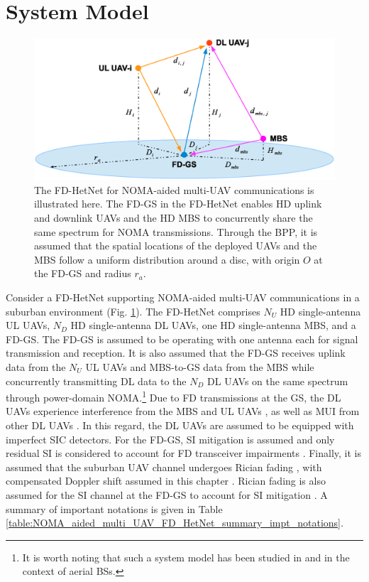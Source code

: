 \section{System Model} \label{NOMA_aided_multi_UAV_FD_HetNet_sec_sys_model}
\begin{figure} [tpb]
\centering
\vspace{-0.7cm}
\includegraphics [width=0.6\columnwidth]{chap7_fig/block_diagram3.eps} 
\vspace{-2cm}
\caption{The FD-HetNet for NOMA-aided multi-UAV communications is illustrated here. The FD-GS in the FD-HetNet enables HD uplink and downlink UAVs and the HD MBS to concurrently share the same spectrum for NOMA transmissions. Through the BPP, it is assumed that the spatial locations of the deployed UAVs and the MBS follow a uniform distribution around a disc, with origin $O$ at the FD-GS and radius $r_a$.}
\label{fig:NOMA_aided_multi_UAV_FD_HetNet_block_diagram}
\end{figure}

Consider a FD-HetNet supporting NOMA-aided multi-UAV communications in a suburban environment (Fig. \ref{fig:NOMA_aided_multi_UAV_FD_HetNet_block_diagram}). The FD-HetNet comprises $N_{U}$ HD single-antenna UL UAVs, $N_D$ HD single-antenna DL UAVs, one HD single-antenna MBS, and a FD-GS. The FD-GS is assumed to be operating with one antenna each for signal transmission and reception. It is also assumed that the FD-GS receives uplink data from the $N_{U}$ UL UAVs and MBS-to-GS data from the MBS while concurrently transmitting DL data to the $N_D$ DL UAVs on the same spectrum through power-domain NOMA.\footnote{It is worth noting that such a system model has been studied in \cite{zhang20183} and \cite{zhang2018number} in the context of aerial BSs.} Due to FD transmissions at the GS, the DL UAVs experience interference from the MBS and UL UAVs \cite{tan2018joint,ernest2019outage}, as well as MUI from other DL UAVs \cite{ernest2019noma}. In this regard, the DL UAVs are assumed to be equipped with imperfect SIC detectors. For the FD-GS, SI mitigation is assumed and only residual SI is considered to account for FD transceiver impairments \cite{ernest2019hybrid,tan2018joint,ernest2019outage,sahai2013impact}. Finally, it is assumed that the suburban UAV channel undergoes Rician fading \cite{matolak2017air_suburban}, with compensated Doppler shift assumed in this chapter \cite{tan2018joint,ernest2019outage}. Rician fading is also assumed for the SI channel at the FD-GS to account for SI mitigation \cite{tan2018joint,ernest2019outage, ernest2019hybrid}. A summary of important notations is given in Table \ref{table:NOMA_aided_multi_UAV_FD_HetNet_summary_impt_notations}.


